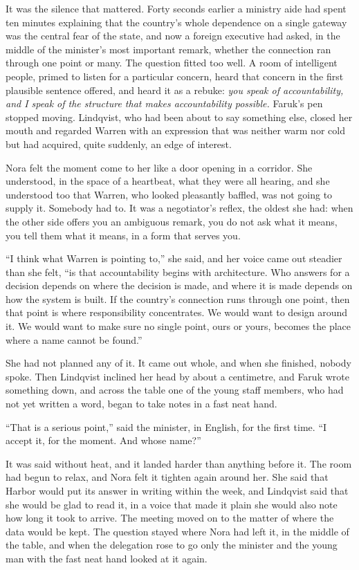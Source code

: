It was the silence that mattered. Forty seconds earlier a ministry aide had spent ten minutes explaining that the country's whole dependence on a single gateway was the central fear of the state, and now a foreign executive had asked, in the middle of the minister's most important remark, whether the connection ran through one point or many. The question fitted too well. A room of intelligent people, primed to listen for a particular concern, heard that concern in the first plausible sentence offered, and heard it as a rebuke: \emph{you speak of accountability, and I speak of the structure that makes accountability possible.} Faruk's pen stopped moving. Lindqvist, who had been about to say something else, closed her mouth and regarded Warren with an expression that was neither warm nor cold but had acquired, quite suddenly, an edge of interest.

Nora felt the moment come to her like a door opening in a corridor. She understood, in the space of a heartbeat, what they were all hearing, and she understood too that Warren, who looked pleasantly baffled, was not going to supply it. Somebody had to. It was a negotiator's reflex, the oldest she had: when the other side offers you an ambiguous remark, you do not ask what it means, you tell them what it means, in a form that serves you.

``I think what Warren is pointing to,'' she said, and her voice came out steadier than she felt, ``is that accountability begins with architecture. Who answers for a decision depends on where the decision is made, and where it is made depends on how the system is built. If the country's connection runs through one point, then that point is where responsibility concentrates. We would want to design around it. We would want to make sure no single point, ours or yours, becomes the place where a name cannot be found.''

She had not planned any of it. It came out whole, and when she finished, nobody spoke. Then Lindqvist inclined her head by about a centimetre, and Faruk wrote something down, and across the table one of the young staff members, who had not yet written a word, began to take notes in a fast neat hand.

``That is a serious point,'' said the minister, in English, for the first time. ``I accept it, for the moment. And whose name?''

It was said without heat, and it landed harder than anything before it. The room had begun to relax, and Nora felt it tighten again around her. She said that Harbor would put its answer in writing within the week, and Lindqvist said that she would be glad to read it, in a voice that made it plain she would also note how long it took to arrive. The meeting moved on to the matter of where the data would be kept. The question stayed where Nora had left it, in the middle of the table, and when the delegation rose to go only the minister and the young man with the fast neat hand looked at it again.

